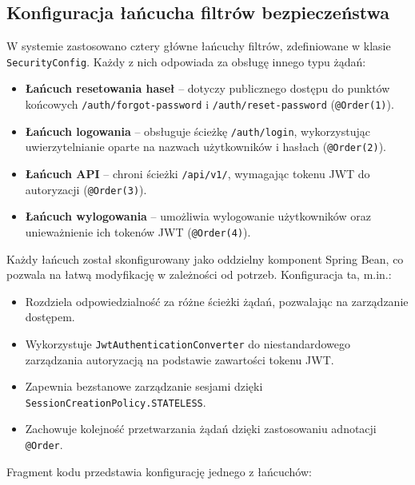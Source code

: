 \subsection{Konfiguracja łańcucha filtrów bezpieczeństwa}

W systemie zastosowano cztery główne łańcuchy filtrów, zdefiniowane w klasie \texttt{SecurityConfig}. Każdy z nich odpowiada za obsługę innego typu żądań:

\begin{itemize}
    \item \textbf{Łańcuch resetowania haseł} -- dotyczy publicznego dostępu do punktów końcowych \texttt{/auth/forgot-password} i \texttt{/auth/reset-password} (\texttt{@Order(1)}).
    \item \textbf{Łańcuch logowania} -- obsługuje ścieżkę \texttt{/auth/login}, wykorzystując uwierzytelnianie oparte na nazwach użytkowników i hasłach (\texttt{@Order(2)}).
    \item \textbf{Łańcuch API} -- chroni ścieżki \texttt{/api/v1/}, wymagając tokenu JWT do autoryzacji (\texttt{@Order(3)}).
    \item \textbf{Łańcuch wylogowania} -- umożliwia wylogowanie użytkowników oraz unieważnienie ich tokenów JWT (\texttt{@Order(4)}).
\end{itemize}

\noindent
Każdy łańcuch został skonfigurowany jako oddzielny komponent Spring Bean, co pozwala na łatwą modyfikację w zależności od potrzeb. Konfiguracja ta, m.in.:
\begin{itemize}
    \item Rozdziela odpowiedzialność za różne ścieżki żądań, pozwalając na zarządzanie dostępem.
    \item Wykorzystuje \texttt{JwtAuthenticationConverter} do niestandardowego zarządzania autoryzacją na podstawie zawartości tokenu JWT.
    \item Zapewnia bezstanowe zarządzanie sesjami dzięki \texttt{SessionCreationPolicy.STATELESS}.
    \item Zachowuje kolejność przetwarzania żądań dzięki zastosowaniu adnotacji \texttt{@Order}.
\end{itemize}

\noindent Fragment kodu przedstawia konfigurację jednego z łańcuchów:

